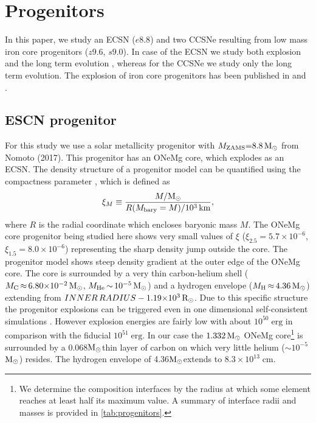 \documentclass[fleqn,usenatbib]{mnras}
\newcommand{\solr}{\xspace\ensuremath{\rm{R_{\odot}}}}
\newcommand{\solm}{\xspace\ensuremath{\rm{M_{\odot}}}}
\begin{document}
\section{Progenitors}
In this paper, we study an ECSN ($e8.8$) and two  CCSNe resulting from low mass iron core  progenitors ($z9.6$, $s9.0$). In case of the ECSN we study both explosion and the long term evolution , whereas for the CCSNe we study only the long term evolution. The explosion of iron core progenitors has been published in \cite{Melson2015} and \cite{Melson2019}. 

\subsection{ESCN progenitor}
For this study we use a solar metallicity progenitor with $M_{\rm ZAMS}\mathord{=}8.8\,\solm$ from Nomoto (2017). This progenitor has an ONeMg core, which explodes as an ECSN. The density structure of a progenitor model can be quantified using the compactness parameter \citep{Oconnor2011}, which is defined as
\begin{equation}
\label{equ:compactness}
  \xi_{M} \equiv \frac{M/\solm}{R(M_{\rm bary}=M)/10^{3}\, \rm km},
\end{equation}
where $R$ is the radial coordinate which encloses baryonic mass $M$. The ONeMg core progenitor being studied here shows very small values of $\xi$ ($\xi_{2.5}=5.7\times10^{-6}$, $\xi_{1.5}=8.0\times10^{-6}$)  representing the sharp density jump outside the core. The progenitor model shows steep density gradient at the outer edge of the ONeMg core. The core is surrounded by a very thin carbon-helium shell ($M_{\rm C}\,\mathord{\approx}\, 6.80\mathord{\times}10^{-2}\, \solm$, $M_{\rm He}\,\mathord{\sim}\,10^{-5}\, \solm$) and a hydrogen envelope ($M_{\rm H}\,\mathord{\approx}\, 4.36\, \solm$) extending from $INNER\, RADIUS- \mathord{1.19}\mathord{\times}10^{3}\, \solr$.
Due to this specific structure the progenitor explosions can be triggered even in one dimensional self-consistent simulations \citet{VonGroote, Kitaura2006}. However explosion energies are fairly low with about $10^{50}\;\mathrm{erg}$ in comparison with the fiducial $10^{51}\;\mathrm{erg}$. In our case the $1.332\, \solm$ ONeMg core\footnote{We determine the composition interfaces by the radius at which some element reaches at least half its maximum value. A summary of interface radii and masses is provided in \autoref{tab:progenitors}.} is surrounded by a 0.068\solm thin layer of carbon on which very little helium ($\sim 10^{-5}$\solm) resides. The hydrogen envelope of 4.36\solm extends to $8.3\times10^{13}\;\mathrm{cm}$. 
\end{document}
